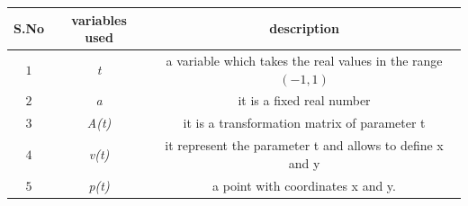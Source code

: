 \begin{tabular}[12pt]{ |c| c| c|}
    \hline
    \textbf{S.No} & \textbf{variables used}&\textbf{description}\\ 
    \hline
	$1$ & \textit{t} & a variable which takes the real values in the range $(-1,1)$\\
    \hline
	$2$ & \textit{a} & it is a fixed real number \\
    \hline
	$3$ & \textit{A(t)} & it is a transformation matrix of parameter t\\
    \hline
	$4$ & \textit{v(t)} & it represent the parameter t and allows to define x and y \\
    \hline
	$5$ & \textit{p(t)} & a point with coordinates x and y. \\
    \hline
    \end{tabular}
